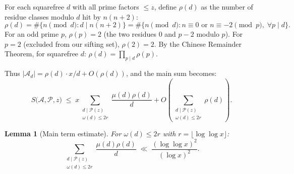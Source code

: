 \documentclass[12pt,a4paper]{amsart}
\newtheorem{lemma}[theorem]{Lemma}
\theoremstyle{definition}
\begin{document}
For each squarefree $d$ with all prime factors $\leq z$, define
$\rho(d)$ as the number of residue classes modulo $d$ hit by $n(n+2)$:
\[
  \rho(d)
  = \#\{n \pmod d : d \mid n(n+2)\}
  = \#\{n \pmod d : n \equiv 0 \text{ or } n \equiv -2 \pmod p,\; \forall p \mid d\}.
\]
For an odd prime $p$, $\rho(p) = 2$ (the two residues $0$ and $p-2$ modulo $p$).
For $p = 2$ (excluded from our sifting set), $\rho(2) = 2$.
By the Chinese Remainder Theorem, for squarefree $d$: $\rho(d) = \prod_{p \mid d} \rho(p)$.

Thus $|\mathcal{A}_d| = \rho(d) \cdot x/d + O(\rho(d))$, and the main sum becomes:
\begin{equation}\label{eq:main_sum}
  S\!\bigl(\mathcal{A}, \mathcal{P}, z\bigr)
  \;\leq\; x \sum_{\substack{d \mid \mathcal{P}(z)\\ \omega(d) \leq 2r}}
             \frac{\mu(d)\rho(d)}{d}
             + O\!\left(\sum_{\substack{d \mid \mathcal{P}(z)\\ \omega(d)\leq 2r}} \rho(d)\right).
\end{equation}

\begin{lemma}[Main term estimate]\label{lem:main_term}
  For $\omega(d) \leq 2r$ with $r = \lfloor \log\log x \rfloor$:
  \[
    \sum_{\substack{d \mid \mathcal{P}(z)\\ \omega(d) \leq 2r}}
    \frac{\mu(d)\rho(d)}{d}
    \;\ll\; \frac{(\log\log x)^2}{(\log x)^2}.
  \]
\end{lemma}
\end{document}
